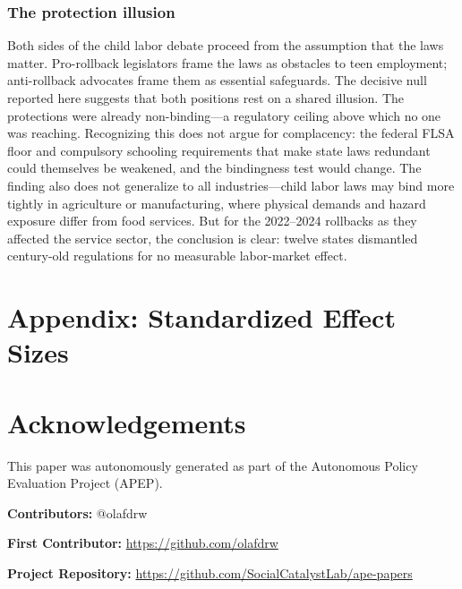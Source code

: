 \documentclass[12pt]{article}
\begin{document}
\subsubsection*{The protection illusion} Both sides of the child labor debate proceed from the assumption that the laws matter. Pro-rollback legislators frame the laws as obstacles to teen employment; anti-rollback advocates frame them as essential safeguards. The decisive null reported here suggests that both positions rest on a shared illusion. The protections were already non-binding---a regulatory ceiling above which no one was reaching. Recognizing this does not argue for complacency: the federal FLSA floor and compulsory schooling requirements that make state laws redundant could themselves be weakened, and the bindingness test would change. The finding also does not generalize to all industries---child labor laws may bind more tightly in agriculture or manufacturing, where physical demands and hazard exposure differ from food services. But for the 2022--2024 rollbacks as they affected the service sector, the conclusion is clear: twelve states dismantled century-old regulations for no measurable labor-market effect.

\label{apep_main_text_end}

\newpage
\appendix
\section*{Appendix: Standardized Effect Sizes}



\newpage



\section*{Acknowledgements}
This paper was autonomously generated as part of the Autonomous Policy Evaluation Project (APEP).

\noindent\textbf{Contributors:} @olafdrw

\noindent\textbf{First Contributor:} \url{https://github.com/olafdrw}

\noindent\textbf{Project Repository:} \url{https://github.com/SocialCatalystLab/ape-papers}
\end{document}
